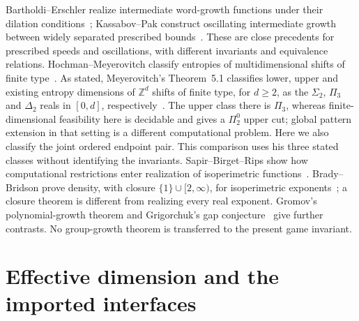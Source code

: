 Bartholdi--Erschler realize intermediate word-growth functions under their dilation conditions~\cite{BE}; Kassabov--Pak construct oscillating intermediate growth between widely separated prescribed bounds~\cite{KP}. These are close precedents for prescribed speeds and oscillations, with different invariants and equivalence relations. Hochman--Meyerovitch classify entropies of multidimensional shifts of finite type~\cite{HM}. As stated, Meyerovitch's Theorem~5.1 classifies lower, upper and existing entropy dimensions of $\mathbb Z^d$ shifts of finite type, for $d\ge2$, as the $\Sigma_2$, $\Pi_3$ and $\Delta_2$ reals in $[0,d]$, respectively~\cite{Meyerovitch}. The upper class there is $\Pi_3$, whereas finite-dimensional feasibility here is decidable and gives a $\Pi^0_2$ upper cut; global pattern extension in that setting is a different computational problem. Here we also classify the joint ordered endpoint pair. This comparison uses his three stated classes without identifying the invariants. Sapir--Birget--Rips show how computational restrictions enter realization of isoperimetric functions~\cite{SBR}. Brady--Bridson prove density, with closure $\{1\}\cup[2,\infty)$, for isoperimetric exponents~\cite{BB}; a closure theorem is different from realizing every real exponent. Gromov's polynomial-growth theorem and Grigorchuk's gap conjecture~\cite{Gromov,Grigorchuk} give further contrasts. No group-growth theorem is transferred to the present game invariant.

\section{Effective dimension and the imported interfaces}\label{sec:interfaces}

